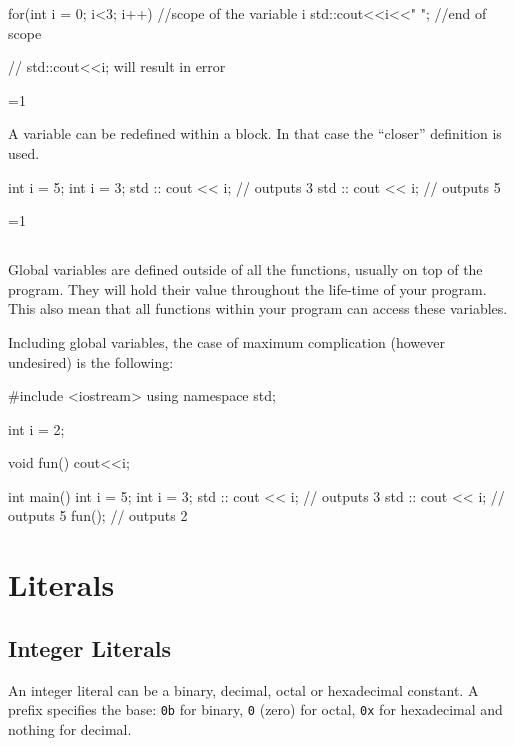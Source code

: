 \documentclass[10pt,a4paper]{scrartcl}
\gdef\conditionmacro{0}
\begin{document}
\begin{multicols*}{2}
\begin{TPCpp}
for(int i = 0; i<3; i++){ //scope of the variable i
	std::cout<<i<<" ";
} //end of scope

// std::cout<<i; will result in error
\end{TPCpp}

\ifnum\conditionmacro=1

A variable can be redefined within a block. In that case the ``closer'' definition is used.

\begin{TPCpp}
int i = 5;
{
	int i = 3;
	std :: cout << i; // outputs 3
}
std :: cout << i; // outputs 5
\end{TPCpp}
\fi

\ifnum\conditionmacro=1
\subsection{}
\label{sec:GlobalVariables}

Global variables are defined outside of all the functions, usually on top of the program. They will hold their value throughout the life-time of your program. This also mean that all functions within your program can access these variables.

Including global variables, the case of maximum complication (however undesired) is the following:

\begin{TPCpp}
#include <iostream>
using namespace std;

int i = 2;

void fun(){
	cout<<i;
}

int main(){
	int i = 5;
	{
		int i = 3;
		std :: cout << i;   // outputs 3
	}
	std :: cout << i;     // outputs 5
	fun();                // outputs 2
}
\end{TPCpp}
\fi

\section{Literals}
\label{sec:Literals}

\subsection{Integer Literals}
\label{sec:IntegerLiterals}

An integer literal can be a binary, decimal, octal or hexadecimal constant. A prefix specifies the base: \verb+0b+ for binary, \verb+0+ (zero) for octal, \verb+0x+ for hexadecimal and nothing for decimal.


\end{multicols*}
\end{document}

